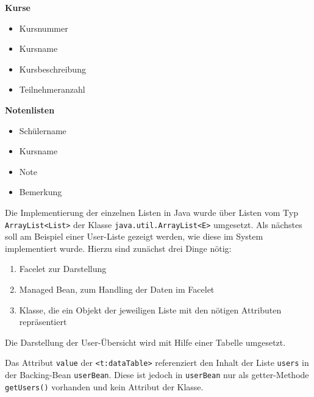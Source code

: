 \textbf{Kurse}
\begin{itemize}
  \item Kursnummer
  \item Kursname
  \item Kursbeschreibung
  \item Teilnehmeranzahl
\end{itemize}

\textbf{Notenlisten}
\begin{itemize}
  \item Schülername
  \item Kursname
  \item Note
  \item Bemerkung
\end{itemize}

Die Implementierung der einzelnen Listen in Java wurde über Listen vom Typ \texttt{ArrayList<List>} der Klasse \texttt{java.util.ArrayList<E>} umgesetzt. 
Als nächstes soll am Beispiel einer User-Liste gezeigt werden, wie diese im System implementiert wurde.
Hierzu sind zunächst drei Dinge nötig:
\begin{enumerate}
  \item Facelet zur Darstellung
  \item Managed Bean, zum Handling der Daten im Facelet
  \item Klasse, die ein Objekt der jeweiligen Liste mit den nötigen Attributen repräsentiert
\end{enumerate}

Die Darstellung der User-Übersicht wird mit Hilfe einer Tabelle umgesetzt.

	

Das Attribut \texttt{value} der \texttt{<t:dataTable>} referenziert den Inhalt der Liste \texttt{users} in der Backing-Bean \texttt{userBean}. Diese ist jedoch in \texttt{userBean} nur als getter-Methode \texttt{getUsers()} vorhanden und kein Attribut der Klasse.

	

